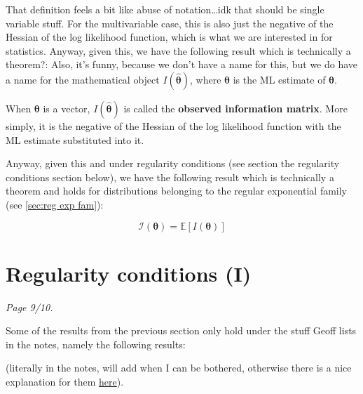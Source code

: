 That definition feels a bit like abuse of notation\ldots idk that should be single variable stuff. 
For the multivariable case, this is also just the negative of the Hessian of the log likelihood function, which is what we are interested in for statistics. 
Anyway, given this, we have the following result which is technically a theorem?:
Also, it's funny, because we don't have a name for this, but we do have a name for the mathematical object \(I(\hat{\bm{\theta}})\), where \(\hat{\bm{\theta}}\) is the ML estimate of \(\bm{\theta}\).

\begin{definition}\label{defn:observed information matrix multi}
    When \(\bm{\theta}\) is a vector, \(I(\hat{\bm{\theta}})\) is called the \textbf{observed information matrix}. 
    More simply, it is the negative of the Hessian of the log likelihood function with the ML estimate substituted into it. 
\end{definition}

Anyway, given this and under regularity conditions (see section the regularity conditions section below), we have the following result which is technically a theorem and holds for distributions belonging to the regular exponential family (see \cref{sec:reg exp fam}):

\begin{equation}\label{eq:thm about expected info as the expectation of I}
    \mathscr{I}(\bm{\theta}) = \mathbb{E}[I(\bm{\theta})]
\end{equation}




\section{Regularity conditions (I)}\label{sec:reg conds I}

\textit{Page 9/10.}

\bigskip

Some of the results from the previous section only hold under the stuff Geoff lists in the notes, namely the following results:

(literally in the notes, will add when I can be bothered, otherwise there is a nice explanation for them \href{https://stats.stackexchange.com/questions/101520/what-are-the-regularity-conditions-for-likelihood-ratio-test}{here}).

